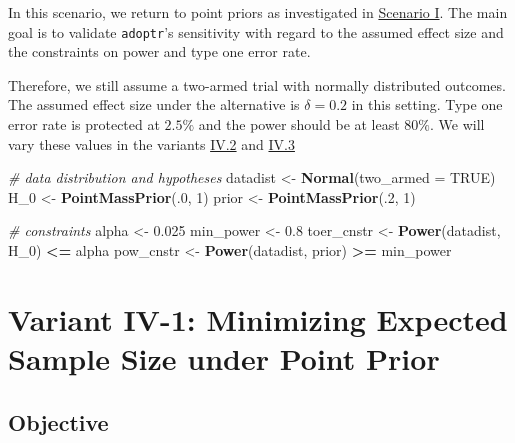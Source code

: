 \documentclass[
]{book}
\newenvironment{Shaded}{\begin{snugshade}}{\end{snugshade}}
\newcommand{\CommentTok}[1]{\textcolor[rgb]{0.56,0.35,0.01}{\textit{#1}}}
\newcommand{\DataTypeTok}[1]{\textcolor[rgb]{0.13,0.29,0.53}{#1}}
\newcommand{\DecValTok}[1]{\textcolor[rgb]{0.00,0.00,0.81}{#1}}
\newcommand{\FloatTok}[1]{\textcolor[rgb]{0.00,0.00,0.81}{#1}}
\newcommand{\KeywordTok}[1]{\textcolor[rgb]{0.13,0.29,0.53}{\textbf{#1}}}
\newcommand{\NormalTok}[1]{#1}
\newcommand{\OperatorTok}[1]{\textcolor[rgb]{0.81,0.36,0.00}{\textbf{#1}}}
\newcommand{\OtherTok}[1]{\textcolor[rgb]{0.56,0.35,0.01}{#1}}
\newcommand{\StringTok}[1]{\textcolor[rgb]{0.31,0.60,0.02}{#1}}
\begin{document}
In this scenario, we return to point priors as investigated in
\protect\hyperlink{scenarioI}{Scenario I}.
The main goal is to validate \texttt{adoptr}'s sensitivity with regard to
the assumed effect size and the constraints on power and type one error rate.

Therefore, we still assume a two-armed trial with normally distributed outcomes.
The assumed effect size under the alternative is \(\delta = 0.2\) in this setting.
Type one error rate is protected at \(2.5\%\) and the power should be at least
\(80\%\). We will vary these values in the variants \protect\hyperlink{variantIV.2}{IV.2} and
\protect\hyperlink{variantIV.3}{IV.3}

\begin{Shaded}
\begin{Highlighting}[]
\CommentTok{\# data distribution and hypotheses}
\NormalTok{datadist   \textless{}{-}}\StringTok{ }\KeywordTok{Normal}\NormalTok{(}\DataTypeTok{two\_armed =} \OtherTok{TRUE}\NormalTok{)}
\NormalTok{H\_}\DecValTok{0}\NormalTok{        \textless{}{-}}\StringTok{ }\KeywordTok{PointMassPrior}\NormalTok{(.}\DecValTok{0}\NormalTok{, }\DecValTok{1}\NormalTok{)}
\NormalTok{prior      \textless{}{-}}\StringTok{ }\KeywordTok{PointMassPrior}\NormalTok{(.}\DecValTok{2}\NormalTok{, }\DecValTok{1}\NormalTok{)}

\CommentTok{\# constraints}
\NormalTok{alpha      \textless{}{-}}\StringTok{ }\FloatTok{0.025}
\NormalTok{min\_power  \textless{}{-}}\StringTok{ }\FloatTok{0.8}
\NormalTok{toer\_cnstr \textless{}{-}}\StringTok{ }\KeywordTok{Power}\NormalTok{(datadist, H\_}\DecValTok{0}\NormalTok{)   }\OperatorTok{\textless{}=}\StringTok{ }\NormalTok{alpha}
\NormalTok{pow\_cnstr  \textless{}{-}}\StringTok{ }\KeywordTok{Power}\NormalTok{(datadist, prior) }\OperatorTok{\textgreater{}=}\StringTok{ }\NormalTok{min\_power}
\end{Highlighting}
\end{Shaded}

\hypertarget{variantIV_1}{%
\section{Variant IV-1: Minimizing Expected Sample Size under Point Prior}\label{variantIV_1}}

\hypertarget{objective-7}{%
\subsection{Objective}\label{objective-7}}
\end{document}

